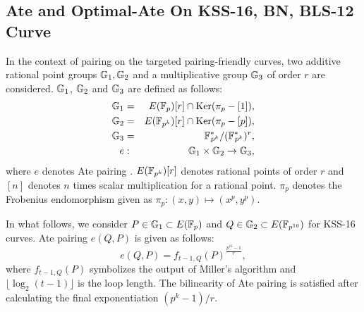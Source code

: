 \begin{table*}[ht]
	\caption{Number of arithmetic operations in $\FPTV$ based on \eqref{BN_towering}.}
	\label{tab_f12_op_count}
	\centering
\end{table*}

\subsection{Ate and Optimal-Ate On KSS-16, BN, BLS-12 Curve}
\label{sec:ch:indo:optate_ksss16}

In the context of pairing on the targeted pairing-friendly curves, two additive rational point groups ${\mathbb{G}}_{1}, {\mathbb{G}}_{2}$ and a multiplicative group ${\mathbb{G}}_{3}$ of order $r$ are considered. 
${\mathbb{G}}_{1}$, ${\mathbb{G}}_{2}$ and ${\mathbb{G}}_{3}$ are defined as follows:
\begin{eqnarray}
{\mathbb{G}}_{1} & = &  E(\mathbb{F}_p) [r] \cap \text{Ker}(\pi_p - [1]), \nonumber \\
{\mathbb{G}}_{2} & = &  E({\mathbb{F}}_{p^{k}}) [r] \cap \text{Ker}(\pi_p - [p]), \nonumber \\
{\mathbb{G}}_{3} & = & {{\mathbb{F}}^{\ast}}_{\!\!\!p^{k}}/({{\mathbb{F}}^{\ast}}_{\!\!\!p^{k}})^r, \nonumber \\
e & : &{\mathbb{G}}_{1} \times {\mathbb{G}}_{2} \rightarrow {\mathbb{G}}_{3},
\end{eqnarray}
where $e$ denotes Ate pairing \cite{DBLP:reference/crc/2005ehcc}. $E({\mathbb{F}}_{p^{k}})[r]$ denotes rational points of order $r$ and $[n]$ denotes $n$ times scalar multiplication for a rational point. 
$\pi_p$ denotes the Frobenius endomorphism given as $\pi_p: (x,y) \mapsto (x^p,y^p)$.

In what follows, we consider $P \in {\mathbb{G}}_{1} \subset E(\mathbb{F}_p)$ and  $Q \in {\mathbb{G}}_{2} \subset  E(\mathbb{F}_{p^{16}})$ for KSS-16 curves.
Ate pairing $e(Q,P)$ is given as follows:
\begin{equation}
e(Q,P)=f_{t-1,Q}(P)^{\frac{p^{16}-1}{r}},
\end{equation}
where $f_{t-1,Q}(P)$ symbolizes the output of Miller's algorithm and $\lfloor \log_2 (t-1) \rfloor$ is the loop length. The bilinearity of Ate pairing is satisfied after calculating the final exponentiation $(p^k-1)/r$.


